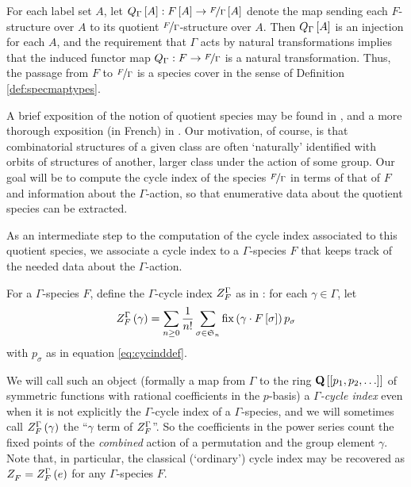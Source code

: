\documentclass[distribution,draft]{brandiss} %
\numberwithin{section}{chapter}
\numberwithin{figure}{chapter}
\begin{document}
For each label set $A$, let $Q_{\Gamma} \left[ {A} \right]: F \left[ {A} \right] \to \nicefrac{F}{\Gamma} \left[ {A} \right]$ denote the map sending each $F$-structure over $A$ to its quotient $\nicefrac{F}{\Gamma}$-structure over $A$.
Then $Q_{\Gamma} \left[ {A} \right]$ is an injection for each $A$, and the requirement that $\Gamma$ acts by natural transformations implies that the induced functor map $Q_{\Gamma}: F \to \nicefrac{F}{\Gamma}$ is a natural transformation.
Thus, the passage from $F$ to $\nicefrac{F}{\Gamma}$ is a species cover in the sense of Definition \ref{def:specmaptypes}.

A brief exposition of the notion of quotient species may be found in \cite[\S 3.6]{bll:species}, and a more thorough exposition (in French) in \cite{bous:species}.
Our motivation, of course, is that combinatorial structures of a given class are often `naturally' identified with orbits of structures of another, larger class under the action of some group.
Our goal will be to compute the cycle index of the species $\nicefrac{F}{\Gamma}$ in terms of that of $F$ and information about the $\Gamma$-action, so that enumerative data about the quotient species can be extracted.

As an intermediate step to the computation of the cycle index associated to this quotient species, we associate a cycle index to a $\Gamma$-species $F$ that keeps track of the needed data about the $\Gamma$-action.
\begin{definition}
  \label{def:gcycind}
  For a $\Gamma$-species $F$, define the $\Gamma$-cycle index $ Z_{F}^{{\Gamma} {}} $ as in \cite{hend:specfield}: for each $\gamma \in \Gamma$, let
  \begin{equation}
     Z_{F}^{{\Gamma} {}} \left( {\gamma} \right)  = \sum_{n \geq 0} \frac{1}{n!} \sum_{\sigma \in  \mathfrak{S}_{n} } \operatorname{fix} \left( {\gamma \cdot F \left[ {\sigma} \right]} \right) p_{\sigma} \label{eq:gcycinddef}
  \end{equation}
  with $p_{\sigma}$ as in equation \eqref{eq:cycinddef}.
\end{definition}

We will call such an object (formally a map from $\Gamma$ to the ring $\mathbf{Q} \left[ {\left[ {p_{1}, p_{2}, \dots} \right]} \right]$ of symmetric functions with rational coefficients in the $p$-basis) a \emph{$\Gamma$-cycle index} even when it is not explicitly the $\Gamma$-cycle index of a $\Gamma$-species, and we will sometimes call $ Z_{F}^{{\Gamma} {}}  \left( {\gamma} \right)$ the ``$\gamma$ term of $ Z_{F}^{{\Gamma} {}} $''.
So the coefficients in the power series count the fixed points of the \emph{combined} action of a permutation and the group element $\gamma$.
Note that, in particular, the classical (`ordinary') cycle index may be recovered as $ Z_{F}^{}  =  Z_{F}^{{\Gamma} {}}  \left( {e} \right)$ for any $\Gamma$-species $F$.
\end{document}
